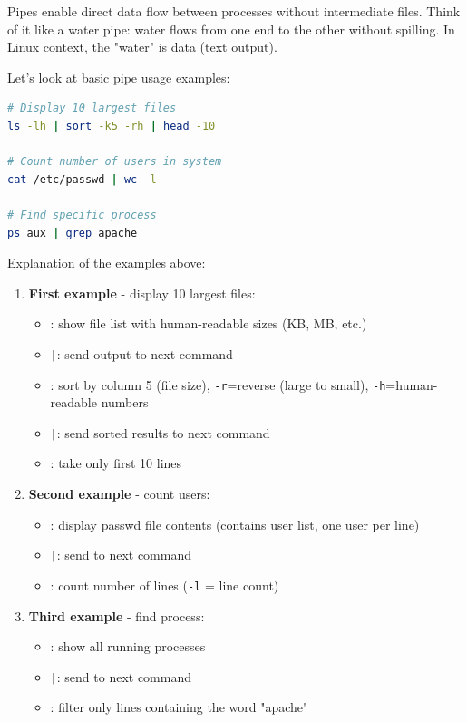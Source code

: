 Pipes enable direct data flow between processes without intermediate files. Think of it like a water pipe: water flows from one end to the other without spilling. In Linux context, the "water" is data (text output).

Let's look at basic pipe usage examples:

\begin{lstlisting}[language=bash, caption={Basic pipe usage}]
# Display 10 largest files
ls -lh | sort -k5 -rh | head -10

# Count number of users in system
cat /etc/passwd | wc -l

# Find specific process
ps aux | grep apache
\end{lstlisting}

Explanation of the examples above:

\begin{enumerate}
	\item \textbf{First example} - display 10 largest files:
	      \begin{itemize}
		      \item {}: show file list with human-readable sizes (KB, MB, etc.)
		      \item \texttt{|}: send output to next command
		      \item {}: sort by column 5 (file size), \texttt{-r}=reverse (large to small), \texttt{-h}=human-readable numbers
		      \item \texttt{|}: send sorted results to next command
		      \item {}: take only first 10 lines
	      \end{itemize}

	\item \textbf{Second example} - count users:
	      \begin{itemize}
		      \item {}: display passwd file contents (contains user list, one user per line)
		      \item \texttt{|}: send to next command
		      \item {}: count number of lines (\texttt{-l} = line count)
	      \end{itemize}

	\item \textbf{Third example} - find process:
	      \begin{itemize}
		      \item {}: show all running processes
		      \item \texttt{|}: send to next command
		      \item {}: filter only lines containing the word "apache"
	      \end{itemize}
\end{enumerate}


